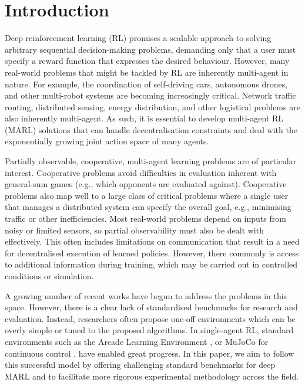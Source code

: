 \section{Introduction}

Deep reinforcement learning (RL) promises a scalable approach to solving arbitrary sequential decision-making problems, demanding only that a user must specify a reward function that expresses the desired behaviour.
However, many real-world problems that might be tackled by RL are inherently multi-agent in nature.
For example, the coordination of self-driving cars, autonomous drones, and other multi-robot systems are becoming increasingly critical. Network traffic routing, distributed sensing, energy distribution, and other logistical problems are also inherently multi-agent. 
As such, it is essential to develop multi-agent RL (MARL) solutions that can handle decentralisation constraints and deal with the exponentially growing joint action space of many agents.

Partially observable, cooperative, multi-agent learning problems are of particular interest.
Cooperative problems avoid difficulties in evaluation inherent with general-sum games (e.g., which opponents are evaluated against). Cooperative problems also map well to a large class of critical problems where a single user that manages a distributed system can specify the overall goal, e.g., minimising traffic or other inefficiencies.
Most real-world problems depend on inputs from noisy or limited sensors, so partial observability must also be dealt with effectively. This often includes limitations on communication that result in a need for decentralised execution of learned policies.
However, there commonly is access to additional information during training, which may be carried out in controlled conditions or simulation.

A growing number of recent works \cite{foerster_counterfactual_2017, rashid_qmix:_2018, sunehag_value-decomposition_2017, lowe_multi-agent_2017} have begun to address the problems in this space.
However, there is a clear lack of standardised benchmarks for research and evaluation.
Instead, researchers often propose one-off environments which can be overly simple or tuned to the proposed algorithms.
In single-agent RL, standard environments such as the Arcade Learning Environment \cite{bellemare13arcade}, or MuJoCo for continuous control \cite{Plappert2019multigoal}, have enabled great progress.
In this paper, we aim to follow this successful model by offering challenging standard benchmarks for deep MARL and to facilitate more rigorous experimental methodology across the field.

